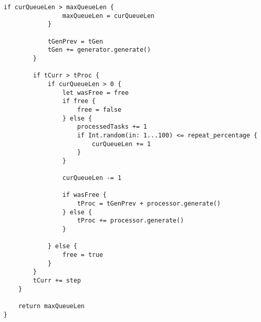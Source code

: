 \begin{lstlisting}[label=code, caption = Основные методы]
            if curQueueLen > maxQueueLen {
                maxQueueLen = curQueueLen
            }
            
            tGenPrev = tGen
            tGen += generator.generate()
        }
            
        if tCurr > tProc {
            if curQueueLen > 0 {
                let wasFree = free
                if free {
                    free = false
                } else {
                    processedTasks += 1
                    if Int.random(in: 1...100) <= repeat_percentage {
                        curQueueLen += 1
                    }
                }
                
                curQueueLen -= 1
                
                if wasFree {
                    tProc = tGenPrev + processor.generate()
                } else {
                    tProc += processor.generate()
                }
                
            } else {
                free = true
            }
        }
        tCurr += step
    }
            
    return maxQueueLen
}
\end{lstlisting}